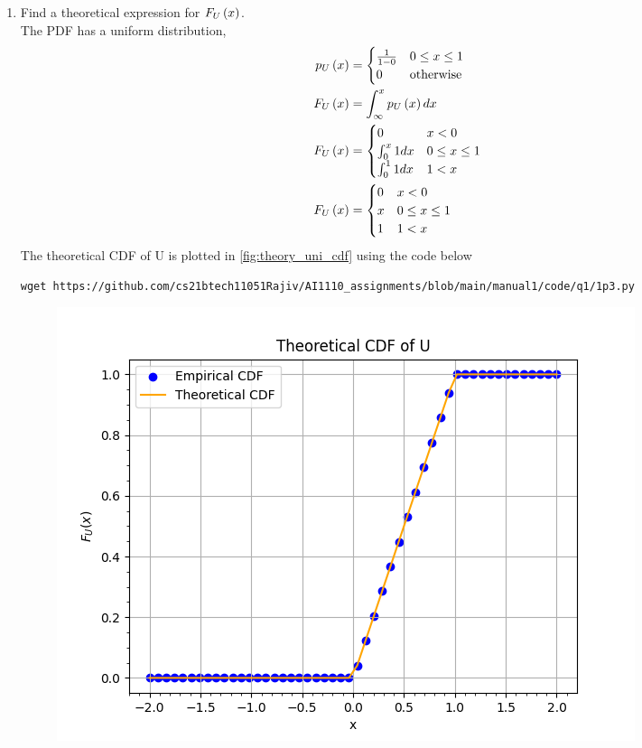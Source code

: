 \documentclass[journal,12pt,twocolumn]{IEEEtran}
\renewcommand\thesection{\arabic{section}}
\begin{document}
\begin{enumerate}[label=\thesection.\arabic*
,ref=\thesection.\theenumi]
%
\item
Find a theoretical expression for $F_{U}\left(x\right)$.
\\
\solution The PDF has a uniform distribution,
\begin{align}
    p_U\left(x\right) &=
        \begin{cases}\frac{1}{1-0} & 0 \le x \le 1 \\
        0 & \text{otherwise}
    \end{cases}\\
    F_{U}\left(x\right) &= \int^{x}_{\infty} p_U\left(x\right) dx \\
    F_U\left(x\right) &=
    \begin{cases}  
        0 & x < 0\\
        \int^{x}_{0} 1 dx & 0 \le x \le 1 \\
        \int^{1}_{0} 1 dx & 1 < x
    \end{cases}\\
    F_U\left(x\right) &=
    \begin{cases}  
        0 & x < 0\\
        x & 0 \le x \le 1 \\
        1 & 1 < x
    \end{cases}
    \label{eq:F_U}
\end{align}
The theoretical CDF of U is plotted in \ref{fig:theory_uni_cdf} using the code below
\begin{lstlisting}
wget https://github.com/cs21btech11051Rajiv/AI1110_assignments/blob/main/manual1/code/q1/1p3.py
\end{lstlisting}
\begin{figure}[ht!]
    \centering
    \includegraphics[width=\columnwidth]{./figs/fig1.3.png}

\end{figure}
\end{enumerate}
\end{document}
